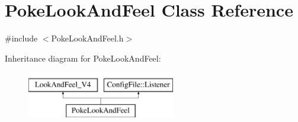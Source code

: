 \hypertarget{classPokeLookAndFeel}{}\section{Poke\+Look\+And\+Feel Class Reference}
\label{classPokeLookAndFeel}


{\ttfamily \#include $<$Poke\+Look\+And\+Feel.\+h$>$}

Inheritance diagram for Poke\+Look\+And\+Feel\+:\begin{figure}[H]
\begin{center}
\leavevmode
\includegraphics[height=2.000000cm]{classPokeLookAndFeel}
\end{center}
\end{figure}
